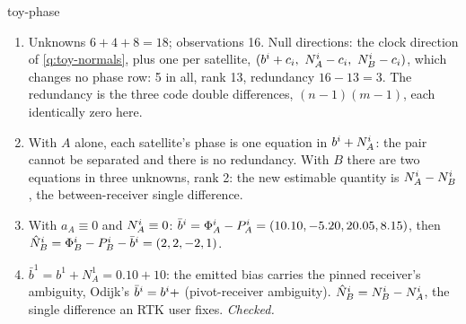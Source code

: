\begin{answer}{toy-phase}
\solution
\begin{enumerate}[leftmargin=*, itemsep=1pt]
\item Unknowns $6 + 4 + 8 = 18$; observations 16. Null directions: the clock
      direction of \cref{q:toy-normals}, plus one per satellite,
      $(b^i + c_i,\ N^i_A - c_i,\ N^i_B - c_i)$, which changes no phase
      row: 5 in all, rank 13, redundancy $16 - 13 = 3$. The redundancy is the three
      code double differences, $(n-1)(m-1)$, each identically zero here.
\item With $A$ alone, each satellite's phase is one equation in $b^i + N^i_A$:
      the pair cannot be separated and there is no redundancy. With $B$ there are two
      equations in three unknowns, rank 2: the new estimable quantity is $N^i_A -
      N^i_B$, the between-receiver single difference.
\item With $a_A \equiv 0$ and $N^i_A \equiv 0$: $\bar b^i = \Phi^i_A -
      P^i_A = (10.10, -5.20, 20.05, 8.15)$, then $\hat N^i_B = \Phi^i_B -
      P^i_B - \bar b^i = (2, 2, -2, 1)$.
\item $\bar b^1 = b^1 + N^1_A = 0.10 + 10$: the emitted bias carries the pinned
      receiver's ambiguity, Odijk's $\bar b^i = b^i + $ (pivot-receiver
      ambiguity). $\hat N^i_B = N^i_B - N^i_A$, the single difference an RTK
      user fixes. \emph{Checked.}
\end{enumerate}
\end{answer}

